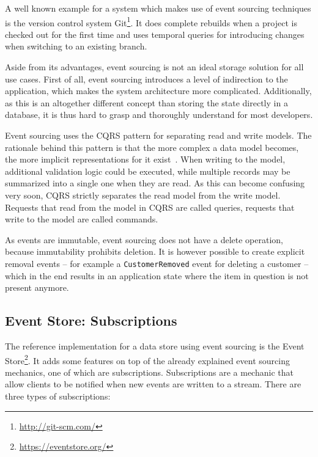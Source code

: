 A well known example for a system which makes use of event sourcing techniques is the version control system Git\footnote{\url{http://git-scm.com/}}.
It does complete rebuilds when a project is checked out for the first time and uses temporal queries for introducing changes when switching to an existing branch.

Aside from its advantages, event sourcing is not an ideal storage solution for all use cases.
First of all, event sourcing introduces a level of indirection to the application, which makes the system architecture more complicated.
Additionally, as this is an altogether different concept than storing the state directly in a database, it is thus hard to grasp and thoroughly understand for most developers.

Event sourcing uses the \acf{CQRS} pattern for separating read and write models.
The rationale behind this pattern is that the more complex a data model becomes, the more implicit representations for it exist~\cite{WEB:Fowler:2011}.
When writing to the model, additional validation logic could be executed, while multiple records may be summarized into a single one when they are read.
As this can become confusing very soon, \ac{CQRS} strictly separates the read model from the write model.
Requests that read from the model in \ac{CQRS} are called queries, requests that write to the model are called commands.


As events are immutable, event sourcing does not have a delete operation, because immutability prohibits deletion.
It is however possible to create explicit removal events -- for example a \texttt{CustomerRemoved} event for deleting a customer -- which in the end results in an application state where the item in question is not present anymore.

\subsection{Event Store: Subscriptions}

The reference implementation for a data store using event sourcing is the Event Store\footnote{\url{https://eventstore.org/}}.
It adds some features on top of the already explained event sourcing mechanics, one of which are subscriptions.
Subscriptions are a mechanic that allow clients to be notified when new events are written to a stream.
There are three types of subscriptions:

